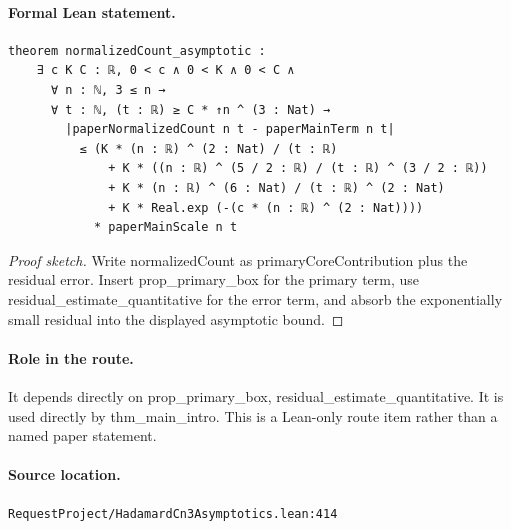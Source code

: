 \medskip
\paragraph{Formal Lean statement.}
\begin{verbatim}
theorem normalizedCount_asymptotic :
    ∃ c K C : ℝ, 0 < c ∧ 0 < K ∧ 0 < C ∧
      ∀ n : ℕ, 3 ≤ n →
      ∀ t : ℕ, (t : ℝ) ≥ C * ↑n ^ (3 : Nat) →
        |paperNormalizedCount n t - paperMainTerm n t|
          ≤ (K * (n : ℝ) ^ (2 : Nat) / (t : ℝ)
              + K * ((n : ℝ) ^ (5 / 2 : ℝ) / (t : ℝ) ^ (3 / 2 : ℝ))
              + K * (n : ℝ) ^ (6 : Nat) / (t : ℝ) ^ (2 : Nat)
              + K * Real.exp (-(c * (n : ℝ) ^ (2 : Nat))))
            * paperMainScale n t
\end{verbatim}
\begin{proof}[Proof sketch]
Write normalizedCount as primaryCoreContribution plus the residual error. Insert prop\_primary\_box for the primary term, use residual\_estimate\_quantitative for the error term, and absorb the exponentially small residual into the displayed asymptotic bound.
\end{proof}
\paragraph{Role in the route.}
It depends directly on prop\_primary\_box, residual\_estimate\_quantitative. It is used directly by thm\_main\_intro. This is a Lean-only route item rather than a named paper statement.
\paragraph{Source location.}
\texttt{RequestProject/HadamardCn3Asymptotics.lean:414}
\medskip
